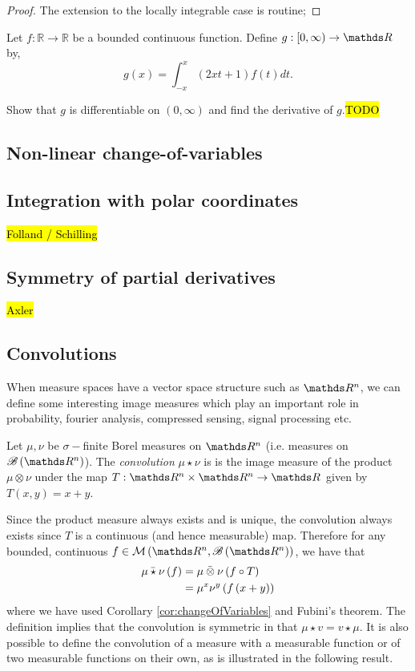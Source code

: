 \begin{proof}
	The extension to the locally integrable case is routine;
\end{proof}





\begin{example}
\label{exa:isi2007samplepsb4}Let $f:\mathbb{R}\rightarrow\mathbb{R}$
be a bounded continuous function. Define $g:[0,\infty)\rightarrow\R$
by, 
\[
g(x)=\int_{-x}^{x}(2xt+1)f(t)dt.
\]

Show that $g$ is differentiable on $(0,\infty)$ and find the derivative
of $g$.\hl{TODO}
\end{example}


\subsection{Non-linear change-of-variables}

\subsection{Integration with polar coordinates}
\hl{Folland / Schilling}

\subsection{Symmetry of partial derivatives}
\hl{Axler}

\subsection{Convolutions\label{subsec:convolutions}}

When measure spaces have a vector space structure such as $\R^{n}$,
we can define some interesting image measures which play an important
role in probability, fourier analysis, compressed sensing, signal
processing etc.
\begin{defn}
\label{def:convolution}Let $\mu,\nu$ be $\sigma-$finite Borel measures
on $\R^{n}$ (i.e. measures on $\borel\left(\R^{n}\right)$). The
\emph{convolution} $\mu\star\nu$ is is the image measure of the product
$\mu\otimes\nu$ under the map $T:\R^{n}\times\R^{n}\to\R$ given
by $T\left(x,y\right)=x+y$.

Since the product measure always exists and is unique, the convolution
always exists since $T$ is a continuous (and hence measurable) map.
Therefore for any bounded, continuous $f\in\mathcal{M}\left(\R^{n},\borel\left(\R^{n}\right)\right)$,
we have that
\begin{align*}
\bar{\mu\star\nu}\left(f\right) & =\bar{\mu\otimes\nu}\left(f\circ T\right)\\
 & =\mu^{x}\nu^{y}\left(f\left(x+y\right)\right)
\end{align*}
where we have used Corollary \ref{cor:changeOfVariables} and Fubini's
theorem. The definition implies that the convolution is symmetric
in that $\mu\star v=v\star\mu$. It is also possible to define the
convolution of a measure with a measurable function or of two measurable
functions on their own, as is illustrated in the following result.
\end{defn}

